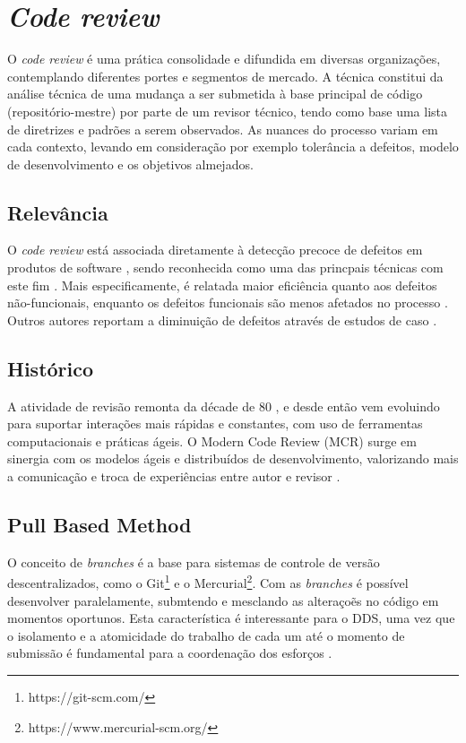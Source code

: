 \documentclass[
        12pt,
        openany, %
        oneside, %
        a4paper,
        english,
        brazil			        %
        ]{abntbibufjf}
\begin{document}
  \section{\textit{Code review}}\label{sec:code_review}
    O \textit{code review} é uma prática consolidade e difundida em diversas organizações, contemplando diferentes portes e segmentos de mercado. A técnica constitui da análise técnica de uma mudança a ser submetida à base principal de código (repositório-mestre) por parte de um revisor técnico, tendo como base uma lista de diretrizes e padrões a serem observados. As nuances do processo variam em cada contexto, levando em consideração por exemplo tolerância a defeitos, modelo de desenvolvimento e os objetivos almejados.

  \subsection{Relevância}\label{sec:relevancia}
    O \textit{code review} está associada diretamente à detecção precoce de defeitos em produtos de software \cite{schettino2014,Kemerer2009}, sendo reconhecida como uma das princpais técnicas com este fim \cite{Boehm2001}. Mais especificamente, é relatada maior eficiência quanto aos defeitos não-funcionais, enquanto os defeitos funcionais são menos afetados no processo \cite{Beller2014202}. Outros autores reportam a diminuição de defeitos através de estudos de caso \cite{McIntosh2014192,Bavota201581,Morales2015171}.

  \subsection{Histórico}\label{sec:historico}
    A atividade de revisão remonta da décade de 80 \cite{Fagan1976}, e desde então vem evoluindo para suportar interações mais rápidas e constantes, com uso de ferramentas computacionais e práticas ágeis. O Modern Code Review (MCR) surge em sinergia com os modelos ágeis e distribuídos de desenvolvimento, valorizando mais a comunicação e troca de experiências entre autor e revisor \cite{Bacchelli2013}.

  \subsection{Pull Based Method}\label{sec:pull_based}
    O conceito de \textit{branches} é a base para sistemas de controle de versão descentralizados, como o  Git\footnote{https://git-scm.com/} e o Mercurial\footnote{https://www.mercurial-scm.org/}. Com as \textit{branches} é possível desenvolver paralelamente, submtendo e mesclando as alteraçoẽs no código em momentos oportunos. Esta característica é interessante para o DDS, uma vez que o isolamento e a atomicidade do trabalho de cada um até o momento de submissão é fundamental para a coordenação dos esforços \cite{barr2012}.
\end{document}
